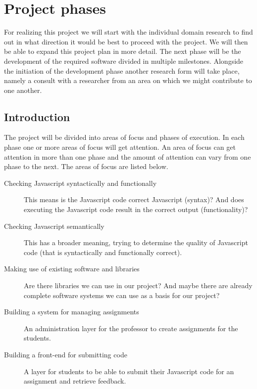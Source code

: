 \documentclass{article}
\begin{document}
\section{Project phases}


For realizing this project we will start with the individual domain research to
find out in what direction it would be best to proceed with the project. We
will then be able to expand this project plan in more detail. The next phase
will be the development of the required software divided in multiple
milestones. Alongside the initiation of the development phase another research
form will take place, namely a consult with a researcher from an area on which
we might contribute to one another.

\subsection{Introduction}


The project will be divided into areas of focus and phases of execution. In
each phase one or more areas of focus will get attention. An area of focus can
get attention in more than one phase and the amount of attention can vary from
one phase to the next. The areas of focus are listed below.

\begin{description}
  \item[Checking Javascript syntactically and functionally] This means is the
    Javascript code correct Javascript (syntax)? And does executing the
    Javascript code result in the correct output (functionality)?
  \item[Checking Javascript semantically] This has a broader meaning, trying to
    determine the quality of Javascript code (that is syntactically and
    functionally correct).
  \item[Making use of existing software and libraries] Are there libraries we
    can use in our project? And maybe there are already complete software
    systems we can use as a basis for our project?
  \item[Building a system for managing assignments] An administration layer for
    the professor to create assignments for the students.
  \item[Building a front-end for submitting code] A layer for students to be
    able to submit their Javascript code for an assignment and retrieve
    feedback.
\end{description}
\end{document}
